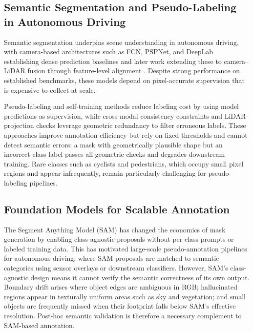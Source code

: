 \documentclass[conference]{IEEEtran}
\begin{document}
\subsection{Semantic Segmentation and Pseudo-Labeling in Autonomous Driving}

Semantic segmentation underpins scene understanding in autonomous driving, with camera-based architectures such as FCN, PSPNet, and DeepLab \cite{long2015fcn,zhao2017psp,chen2018deeplab} establishing dense prediction baselines and later work extending these to camera--LiDAR fusion through feature-level alignment \cite{valada2019selfsupervised,jaritz2019multimodal}. 
Despite strong performance on established benchmarks, these models depend on pixel-accurate supervision that is expensive to collect at scale.

Pseudo-labeling and self-training methods \cite{lee2013pseudo,zou2019confidence} reduce labeling cost by using model predictions as supervision, while cross-modal consistency constraints \cite{jaritz2020xmuda} and LiDAR-projection checks \cite{behley2019semantickitti,caesar2020nuscenes} leverage geometric redundancy to filter erroneous labels. 
These approaches improve annotation efficiency but rely on fixed thresholds and cannot detect semantic errors: a mask with geometrically plausible shape but an incorrect class label passes all geometric checks and degrades downstream training. 
Rare classes such as cyclists and pedestrians, which occupy small pixel regions and appear infrequently, remain particularly challenging for pseudo-labeling pipelines.

\subsection{Foundation Models for Scalable Annotation}

The Segment Anything Model (SAM) \cite{kirillov2023sam} has changed the economics of mask generation by enabling class-agnostic proposals without per-class prompts or labeled training data. 
This has motivated large-scale pseudo-annotation pipelines for autonomous driving, where SAM proposals are matched to semantic categories using sensor overlays or downstream classifiers. 
However, SAM's class-agnostic design means it cannot verify the semantic correctness of its own output. 
Boundary drift arises where object edges are ambiguous in RGB; hallucinated regions appear in texturally uniform areas such as sky and vegetation; and small objects are frequently missed when their footprint falls below SAM's effective resolution. 
Post-hoc semantic validation is therefore a necessary complement to SAM-based annotation.
\end{document}
